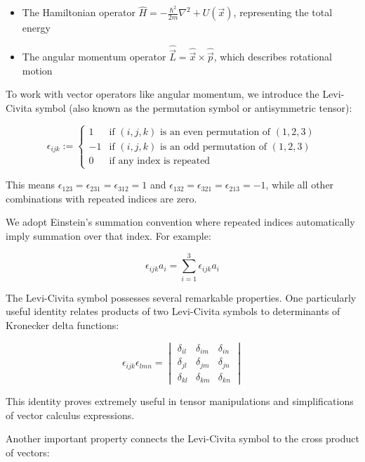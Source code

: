 \begin{itemize}
  \item The Hamiltonian operator $\hat{H}=-\frac{\hbar^{2}}{2 m} \nabla^{2}+U(\vec{x})$, representing the total energy
  \item The angular momentum operator $\hat{\vec{L}}=\hat{\vec{x}} \times \hat{\vec{p}}$, which describes rotational motion
\end{itemize}

To work with vector operators like angular momentum, we introduce the Levi-Civita symbol (also known as the permutation symbol or antisymmetric tensor):

\[
\epsilon_{i j k}:= \begin{cases}
1 & \text{if $(i,j,k)$ is an even permutation of $(1,2,3)$} \\
-1 & \text{if $(i,j,k)$ is an odd permutation of $(1,2,3)$} \\
0 & \text{if any index is repeated}
\end{cases}
\]

This means $\epsilon_{123} = \epsilon_{231} = \epsilon_{312} = 1$ and $\epsilon_{132} = \epsilon_{321} = \epsilon_{213} = -1$, while all other combinations with repeated indices are zero.

We adopt Einstein's summation convention where repeated indices automatically imply summation over that index. For example:

\begin{equation}
\epsilon_{i j k} a_{i}=\sum_{i=1}^3 \epsilon_{i j k} a_{i}
\end{equation}

The Levi-Civita symbol possesses several remarkable properties. One particularly useful identity relates products of two Levi-Civita symbols to determinants of Kronecker delta functions:

\[
\epsilon_{i j k} \epsilon_{l m n}=\begin{vmatrix}
\delta_{i l} & \delta_{i m} & \delta_{i n} \\
\delta_{j l} & \delta_{j m} & \delta_{j n} \\
\delta_{k l} & \delta_{k m} & \delta_{k n}
\end{vmatrix}
\]

This identity proves extremely useful in tensor manipulations and simplifications of vector calculus expressions.

Another important property connects the Levi-Civita symbol to the cross product of vectors:

